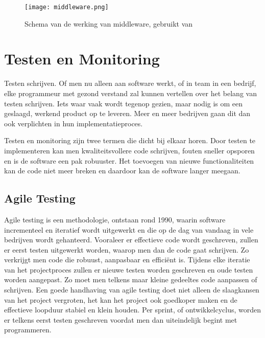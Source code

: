 \begin{figure}[h]
	\texttt{[image: middleware.png]}
	\caption{Schema van de werking van middleware, gebruikt van \cite{middleware}}
	\label{fig:middleware}
\end{figure}

\section{Testen en Monitoring}
\label{sec:testAndMonitoring}

Testen schrijven. Of men nu alleen aan software werkt, of in team in een bedrijf, elke programmeur met gezond verstand zal kunnen vertellen over het belang van testen schrijven. Iets waar vaak wordt tegenop gezien, maar nodig is om een geslaagd, werkend product op te leveren. Meer en meer bedrijven gaan dit dan ook verplichten in hun implementatieproces. 

Testen en monitoring zijn twee termen die dicht bij elkaar horen. Door testen te implementeren kan men kwaliteitsvollere code schrijven, fouten sneller opsporen en is de software een pak robuuster. Het toevoegen van nieuwe functionaliteiten kan de code niet meer breken en daardoor kan de software langer meegaan. 

\subsection{Agile Testing}
\label{sec:agile}

Agile testing is een methodologie, ontstaan rond 1990, waarin software incrementeel en iteratief wordt uitgewerkt en die op de dag van vandaag in vele bedrijven wordt gehanteerd. Vooraleer er effectieve code wordt geschreven, zullen er eerst testen uitgewerkt worden, waarop men dan de code gaat schrijven. Zo verkrijgt men code die robuust, aanpasbaar en efficiënt is. Tijdens elke iteratie van het projectproces zullen er nieuwe testen worden geschreven en oude testen worden aangepast. Zo moet men telkens maar kleine gedeeltes code aanpassen of schrijven. Een goede handhaving van agile testing doet niet alleen de slaagkansen van het project vergroten, het kan het project ook goedkoper maken en de effectieve loopduur stabiel en klein houden.
Per sprint, of ontwikkelcyclus, worden er telkens eerst testen geschreven voordat men dan uiteindelijk begint met programmeren. \autocite{CHAKRAVORTY2014536}

